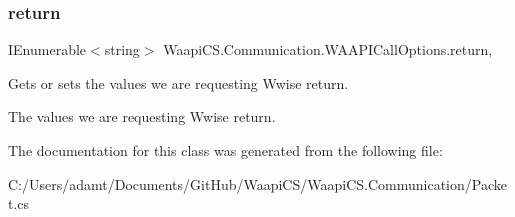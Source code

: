 \subsubsection{\texorpdfstring{return}{return}}
{\footnotesize\ttfamily I\+Enumerable$<$string$>$ Waapi\+C\+S.\+Communication.\+W\+A\+A\+P\+I\+Call\+Options.\+return\hspace{0.3cm}{\ttfamily [get]}, {\ttfamily [set]}}



Gets or sets the values we are requesting Wwise return. 

The values we are requesting Wwise return. 

The documentation for this class was generated from the following file\+:\begin{DoxyCompactItemize}
\item 
C\+:/\+Users/adamt/\+Documents/\+Git\+Hub/\+Waapi\+C\+S/\+Waapi\+C\+S.\+Communication/Packet.\+cs\end{DoxyCompactItemize}
